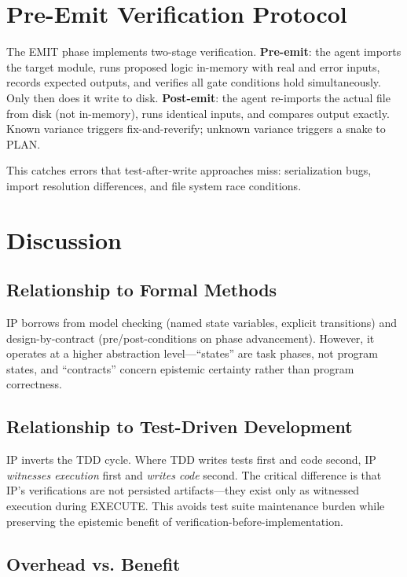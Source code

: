 \documentclass[11pt,twocolumn]{article}
\begin{document}
\section{Pre-Emit Verification Protocol}

The EMIT phase implements two-stage verification. \textbf{Pre-emit}: the agent imports the target module, runs proposed logic in-memory with real and error inputs, records expected outputs, and verifies all gate conditions hold simultaneously. Only then does it write to disk. \textbf{Post-emit}: the agent re-imports the actual file from disk (not in-memory), runs identical inputs, and compares output exactly. Known variance triggers fix-and-reverify; unknown variance triggers a snake to PLAN.

This catches errors that test-after-write approaches miss: serialization bugs, import resolution differences, and file system race conditions.

\section{Discussion}

\subsection{Relationship to Formal Methods}

IP borrows from model checking (named state variables, explicit transitions) and design-by-contract (pre/post-conditions on phase advancement). However, it operates at a higher abstraction level---``states'' are task phases, not program states, and ``contracts'' concern epistemic certainty rather than program correctness.

\subsection{Relationship to Test-Driven Development}

IP inverts the TDD cycle. Where TDD writes tests first and code second, IP \emph{witnesses execution} first and \emph{writes code} second. The critical difference is that IP's verifications are not persisted artifacts---they exist only as witnessed execution during EXECUTE. This avoids test suite maintenance burden while preserving the epistemic benefit of verification-before-implementation.

\subsection{Overhead vs. Benefit}
\end{document}
